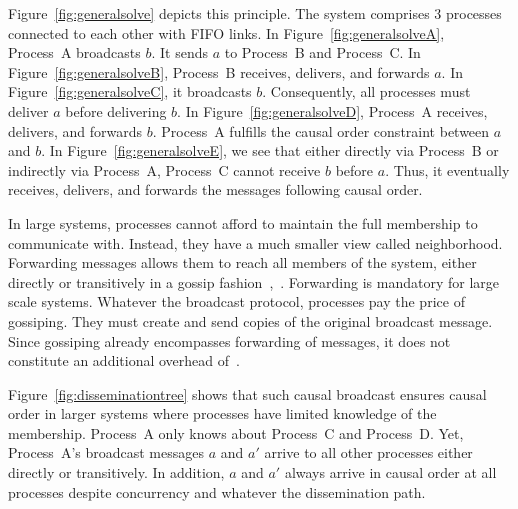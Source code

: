 Figure~\ref{fig:generalsolve} depicts this principle. The system comprises 3
processes connected to each other with FIFO links.  In
Figure~\ref{fig:generalsolveA}, Process~A broadcasts $b$. It sends $a$ to
Process~B and Process~C. In Figure~\ref{fig:generalsolveB}, Process~B receives,
delivers, and forwards $a$. In Figure~\ref{fig:generalsolveC}, it broadcasts
$b$. Consequently, all processes must deliver $a$ before delivering $b$. In
Figure~\ref{fig:generalsolveD}, Process~A receives, delivers, and forwards
$b$. Process~A fulfills the causal order constraint between $a$ and $b$. In
Figure~\ref{fig:generalsolveE}, we see that either directly via Process~B or
indirectly via Process~A, Process~C cannot receive $b$ before $a$. Thus, it
eventually receives, delivers, and forwards the messages following causal order.


In large systems, processes cannot afford to maintain the full membership to
communicate with. Instead, they have a much smaller view called
neighborhood. Forwarding messages allows them to reach all members of the
system, either directly or transitively in a gossip
fashion~\cite{demers1987epidemic},~\cite{birman1999bimodal}. Forwarding is
mandatory for large scale systems.  Whatever the broadcast protocol, processes
pay the price of gossiping. They must create and send copies of the original
broadcast message. Since gossiping already encompasses forwarding of messages,
it does not constitute an additional overhead of~\cite{friedman2004causal}.

Figure~\ref{fig:disseminationtree} shows that such causal broadcast ensures
causal order in larger systems where processes have limited knowledge of the
membership.  Process~A only knows about Process~C and Process~D.  Yet,
Process~A's broadcast messages $a$ and $a'$ arrive to all other processes either
directly or transitively. In addition, $a$ and $a'$ always arrive in causal
order at all processes despite concurrency and whatever the dissemination path.

